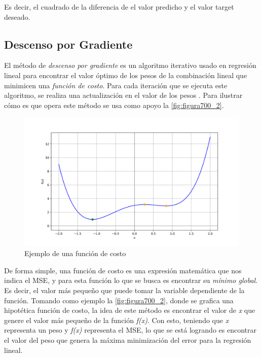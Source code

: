 Es decir, el cuadrado de la diferencia de el valor predicho y el valor target deseado.

\subsection{Descenso por Gradiente}

El método de \textit{descenso por gradiente} es un algoritmo iterativo usado en regresión lineal para encontrar el valor óptimo de los pesos de la combinación lineal que minimicen una \textit{función de costo}. Para cada 
iteración que se ejecuta este algoritmo, se realiza una actualización en el valor de los pesos \cite{PinedaPertuzML}. Para ilustrar cómo es que opera este método se usa como apoyo la \autoref{fig:figura700_2}.

\begin{figure}[h]
	\centering
	\includegraphics[scale=0.6]{imgss206.png}
	\caption{Ejemplo de una función de costo}
	\label{fig:figura700_2}
\end{figure}

De forma simple, una función de costo es una expresión matemática que nos indica el MSE, y para esta función lo que se busca es encontrar su \textit{mínimo global}. Es decir, el valor más pequeño que puede tomar la variable 
dependiente de la función. Tomando como ejemplo la \autoref{fig:figura700_2}, donde se grafica una hipotética función de costo, la idea de este método es encontrar el valor de \textit{x}  que genere el valor 
más pequeño de la función \textit{f(x)}. Con esto, teniendo que \textit{x} representa un peso y \textit{f(x)} representa el MSE, lo que se está logrando es encontrar el valor del peso que genera la máxima 
minimización del error para la regresión lineal.

